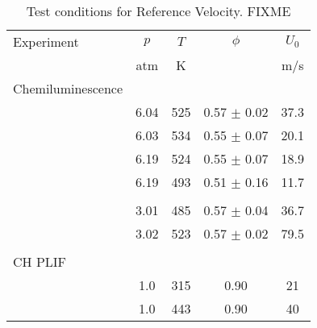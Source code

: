 \begin{table}
  \caption[Test conditions for Reference Velocity]{Test conditions for Reference Velocity. FIXME}
  \begin{center}
    \begin{tabular}{lcccc}
      Experiment & \(p\) & \(T\) & \(\phi\) & \(U_0\) \tabularnewline
      & atm & K & & m/s \tabularnewline
      \hline\hline
      Chemiluminescence & & & & \tabularnewline
      \hline
      & 6.04 & 525 & 0.57 \(\pm\) 0.02 & 37.3 \tabularnewline
      & 6.03 & 534 & 0.55 \(\pm\) 0.07 & 20.1 \tabularnewline
      & 6.19 & 524 & 0.55 \(\pm\) 0.07 & 18.9 \tabularnewline
      & 6.19 & 493 & 0.51 \(\pm\) 0.16 & 11.7 \tabularnewline
      & & & & \tabularnewline
      & 3.01 & 485 & 0.57 \(\pm\) 0.04 & 36.7 \tabularnewline
      & 3.02 & 523 & 0.57 \(\pm\) 0.02 & 79.5 \tabularnewline
      & & & & \tabularnewline
      CH PLIF & & & & \tabularnewline
      \hline
      & 1.0 & 315 & 0.90 & 21 \tabularnewline
      & 1.0 & 443 & 0.90 & 40 \tabularnewline
      \hline
    \end{tabular}
  \end{center}
  \label{tab:referenceVelocityCases}
\end{table}

